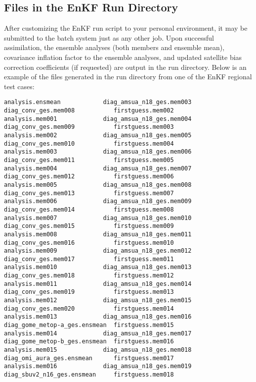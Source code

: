 \subsection{Files in the EnKF Run Directory}

 After customizing the EnKF run script to your personal environment, it may be submitted to the batch system just as any other job. Upon successful assimilation, the ensemble analyses (both members and ensemble mean), covariance inflation factor to the ensemble analyses, and updated satellite bias correction coefficients (if requested) are output in the run directory. Below is an example of the files generated in the run directory from one of the EnKF regional test cases: 
\begin{scriptsize}    
\begin{verbatim}
analysis.ensmean            diag_amsua_n18_ges.mem003  diag_conv_ges.mem008           firstguess.mem002
analysis.mem001             diag_amsua_n18_ges.mem004  diag_conv_ges.mem009           firstguess.mem003
analysis.mem002             diag_amsua_n18_ges.mem005  diag_conv_ges.mem010           firstguess.mem004
analysis.mem003             diag_amsua_n18_ges.mem006  diag_conv_ges.mem011           firstguess.mem005
analysis.mem004             diag_amsua_n18_ges.mem007  diag_conv_ges.mem012           firstguess.mem006
analysis.mem005             diag_amsua_n18_ges.mem008  diag_conv_ges.mem013           firstguess.mem007
analysis.mem006             diag_amsua_n18_ges.mem009  diag_conv_ges.mem014           firstguess.mem008
analysis.mem007             diag_amsua_n18_ges.mem010  diag_conv_ges.mem015           firstguess.mem009
analysis.mem008             diag_amsua_n18_ges.mem011  diag_conv_ges.mem016           firstguess.mem010
analysis.mem009             diag_amsua_n18_ges.mem012  diag_conv_ges.mem017           firstguess.mem011
analysis.mem010             diag_amsua_n18_ges.mem013  diag_conv_ges.mem018           firstguess.mem012
analysis.mem011             diag_amsua_n18_ges.mem014  diag_conv_ges.mem019           firstguess.mem013
analysis.mem012             diag_amsua_n18_ges.mem015  diag_conv_ges.mem020           firstguess.mem014
analysis.mem013             diag_amsua_n18_ges.mem016  diag_gome_metop-a_ges.ensmean  firstguess.mem015
analysis.mem014             diag_amsua_n18_ges.mem017  diag_gome_metop-b_ges.ensmean  firstguess.mem016
analysis.mem015             diag_amsua_n18_ges.mem018  diag_omi_aura_ges.ensmean      firstguess.mem017
analysis.mem016             diag_amsua_n18_ges.mem019  diag_sbuv2_n16_ges.ensmean     firstguess.mem018

\end{verbatim}
\end{scriptsize}
